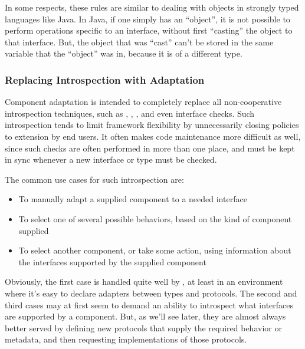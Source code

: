 In some respects, these rules are similar to dealing with objects in strongly
typed languages like Java.  In Java, if one simply has an ``object'', it is not
possible to perform operations specific to an interface, without first
``casting'' the object to that interface.  But, the object that was ``cast''
can't be stored in the same variable that the ``object'' was in, because it
is of a different type.


















\subsubsection{Replacing Introspection with Adaptation}

Component adaptation is intended to completely replace all non-cooperative
introspection techniques, such as , ,
, and even interface checks.  Such introspection
tends to limit framework flexibility by unnecessarily closing policies to
extension by end users.  It often makes code maintenance more difficult as
well, since such checks are often performed in more than one place, and
must be kept in sync whenever a new interface or type must be checked.

The common use cases for such introspection are:

\begin{itemize}

\item To manually adapt a supplied component to a needed interface

\item To select one of several possible behaviors, based on the kind of
component supplied

\item To select another component, or take some action, using information
about the interfaces supported by the supplied component

\end{itemize}

Obviously, the first case is handled quite well by , at
least in an environment where it's easy to declare adapters between types and
protocols.  The second and third cases may at first seem to demand an ability
to introspect what interfaces are supported by a component.  But, as we'll
see later, they are almost always better served by defining new protocols
that supply the required behavior or metadata, and then requesting
implementations of those protocols.

